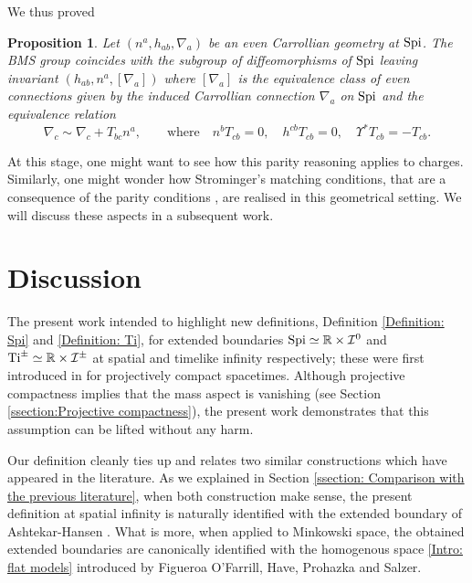 \documentclass[a4paper, 10pt]{article}
\newtheorem{proposition}{Proposition}[section]
\theoremstyle{remark}
\newcommand{\Ti}{\textnormal{Ti}}
\newcommand{\Spi}{\textnormal{Spi}}
\begin{document}
We thus proved
\begin{proposition}\label{Proposition: BMS group inside SPI (2)}
Let $(n^a, h_{ab}, \nabla_a)$ be an even Carrollian geometry at $\Spi$. The BMS group coincides with the subgroup of diffeomorphisms of $\Spi$ leaving invariant $(h_{ab},n^a, [\nabla_a])$ where $[\nabla_a]$ is the equivalence class of \emph{even} connections given by the induced Carrollian connection $\nabla_a$ on $\Spi$ and the equivalence relation
    \begin{equation*}
        \nabla_c \sim \nabla_c  + T_{bc} n^a, \qquad\textrm{where}\quad n^bT_{cb}=0,\quad h^{cb}T_{cb}=0 ,\quad \Upsilon^*T_{cb}=-T_{cb}.
    \end{equation*}
\end{proposition}

At this stage, one might want to see how this parity reasoning applies to charges. Similarly, one might wonder how Strominger's matching conditions, that are a consequence of the parity conditions \cite{Henneaux:2018mgn,Mohamed:2021rfg,Capone:2022gme,Mohamed:2023jwv,Mohamed:2023ttb,Compere:2023qoa}, are realised in this geometrical setting. We will discuss these aspects in a subsequent work.

\section{Discussion}

The present work intended to highlight new definitions, Definition \ref{Definition: Spi} and \ref{Definition: Ti}, for extended boundaries $\Spi \simeq \mathbb{R} \times \mathcal{I}^0$ and $\Ti^{\pm} \simeq \mathbb{R} \times \mathcal{I}^\pm$ at spatial and timelike infinity respectively; these were first introduced in \cite{RSTA20230042,Borthwick:2024wfn} for projectively compact spacetimes. Although projective compactness implies that the mass aspect is vanishing (see Section \ref{ssection:Projective compactness}), the present work demonstrates that this assumption can be lifted without any harm. 

Our definition cleanly ties up and relates two similar constructions which have appeared in the literature. As we explained in Section \ref{ssection: Comparison with the previous literature}, when both construction make sense, the present definition at spatial infinity is naturally identified with the extended boundary of Ashtekar-Hansen \cite{hansen_r._o._metric_1978}. What is more, when applied to Minkowski space, the obtained extended boundaries are canonically identified with the homogenous space \eqref{Intro: flat models}
introduced by Figueroa O'Farrill, Have, Prohazka and Salzer.
\end{document}
